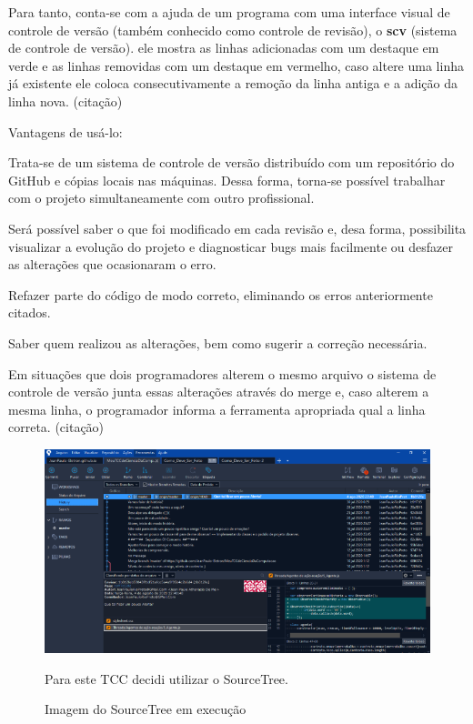 Para tanto, conta-se com a ajuda de um programa com uma interface visual de controle de versão (também conhecido como controle de revisão), o \textbf{scv} (sistema de controle de versão). ele mostra as linhas adicionadas com um destaque em verde e as linhas removidas com um destaque em vermelho, caso altere uma linha já existente ele coloca consecutivamente a remoção da linha antiga e a adição da linha nova. (citação) 				

Vantagens de usá-lo: 
\begin{description}
	\setlength\itemindent{15pt}	
	\item[•] Trata-se de um sistema de controle de versão distribuído com um repositório do GitHub e cópias locais nas máquinas. Dessa forma, torna-se possível trabalhar com o projeto simultaneamente com outro profissional. 
	
	\item[•] Será possível saber o que foi modificado em cada revisão e, desa forma, possibilita visualizar a evolução do projeto e diagnosticar bugs mais facilmente ou desfazer as alterações que ocasionaram o erro. 
	
	\item[•] Refazer parte do código de modo correto, eliminando os erros anteriormente citados. 
	
	\item[•] Saber quem realizou as alterações, bem como sugerir a correção necessária. 
	
	\item[•] Em situações que dois programadores alterem o mesmo arquivo o sistema de controle de versão junta essas alterações através do merge e, caso alterem a mesma linha, o programador informa a ferramenta apropriada qual a linha correta. (citação) 
	
\end{description}  	

\begin{figure}
	\centering
	\caption{Imagem do SourceTree em execução}
	\centering
	\includegraphics[scale=0.9]{./images/Figure_2}	
	
	Para este TCC decidi utilizar o SourceTree.	
	
	\label{fig:Fig2}
\end{figure}


